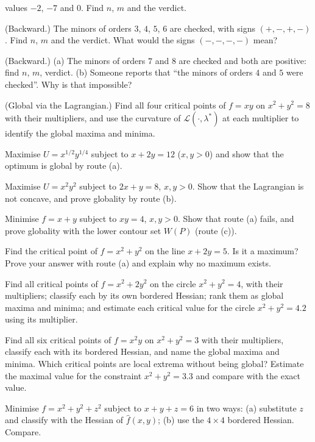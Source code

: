 \begin{problems}
        values $-2$, $-7$ and $0$. Find $n$, $m$ and the verdict.
  \item (Backward.) The minors of orders $3$, $4$, $5$, $6$ are checked,
        with signs $(+,-,+,-)$. Find $n$, $m$ and the verdict. What would
        the signs $(-,-,-,-)$ mean?
  \item (Backward.) (a) The minors of orders $7$ and $8$ are checked and
        both are positive: find $n$, $m$, verdict. (b) Someone reports
        that ``the minors of orders $4$ and $5$ were checked''. Why is that
        impossible?
  \item (Global via the Lagrangian.) Find all four critical points of
        $f=xy$ on $x^{2}+y^{2}=8$ with their multipliers, and use the
        curvature of $\mathcal{L}(\cdot,\lambda^*)$ at each multiplier to
        identify the global maxima and minima.
  \item Maximise $U=x^{1/2}y^{1/4}$ subject to $x+2y=12$ ($x,y>0$) and
        show that the optimum is global by route (a).
  \item Maximise $U=x^{2}y^{2}$ subject to $2x+y=8$, $x,y>0$. Show that the
        Lagrangian is not concave, and prove globality by route (b).
  \item Minimise $f=x+y$ subject to $xy=4$, $x,y>0$. Show that route (a)
        fails, and prove globality with the lower contour set $W(P)$
        (route (c)).
  \item Find the critical point of $f=x^{2}+y^{2}$ on the line $x+2y=5$.
        Is it a maximum? Prove your answer with route (a) and explain why no
        maximum exists.
  \item Find all critical points of $f=x^{2}+2y^{2}$ on the circle
        $x^{2}+y^{2}=4$, with their multipliers; classify each by its own
        bordered Hessian; rank them as global maxima and minima; and
        estimate each critical value for the circle $x^{2}+y^{2}=4.2$ using
        its multiplier.
  \item Find all six critical points of $f=x^{2}y$ on $x^{2}+y^{2}=3$ with
        their multipliers, classify each with its bordered Hessian, and
        name the global maxima and minima. Which critical points are local
        extrema without being global? Estimate the maximal value for the
        constraint $x^{2}+y^{2}=3.3$ and compare with the exact value.
  \item Minimise $f=x^{2}+y^{2}+z^{2}$ subject to $x+y+z=6$ in two ways:
        (a) substitute $z$ and classify with the Hessian of $\hat f(x,y)$;
        (b) use the $4\times4$ bordered Hessian. Compare.

\end{problems}
